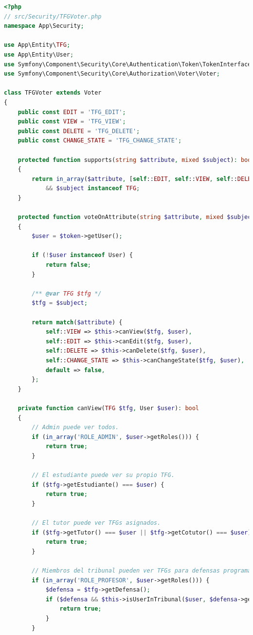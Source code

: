 \documentclass[12pt,a4paper,oneside]{report}
\begin{document}
\begin{lstlisting}[language=PHP]
<?php
// src/Security/TFGVoter.php
namespace App\Security;

use App\Entity\TFG;
use App\Entity\User;
use Symfony\Component\Security\Core\Authentication\Token\TokenInterface;
use Symfony\Component\Security\Core\Authorization\Voter\Voter;

class TFGVoter extends Voter
{
    public const EDIT = 'TFG_EDIT';
    public const VIEW = 'TFG_VIEW';
    public const DELETE = 'TFG_DELETE';
    public const CHANGE_STATE = 'TFG_CHANGE_STATE';

    protected function supports(string $attribute, mixed $subject): bool
    {
        return in_array($attribute, [self::EDIT, self::VIEW, self::DELETE, self::CHANGE_STATE])
            && $subject instanceof TFG;
    }

    protected function voteOnAttribute(string $attribute, mixed $subject, TokenInterface $token): bool
    {
        $user = $token->getUser();

        if (!$user instanceof User) {
            return false;
        }

        /** @var TFG $tfg */
        $tfg = $subject;

        return match($attribute) {
            self::VIEW => $this->canView($tfg, $user),
            self::EDIT => $this->canEdit($tfg, $user),
            self::DELETE => $this->canDelete($tfg, $user),
            self::CHANGE_STATE => $this->canChangeState($tfg, $user),
            default => false,
        };
    }

    private function canView(TFG $tfg, User $user): bool
    {
        // Admin puede ver todos.
        if (in_array('ROLE_ADMIN', $user->getRoles())) {
            return true;
        }

        // El estudiante puede ver su propio TFG.
        if ($tfg->getEstudiante() === $user) {
            return true;
        }

        // El tutor puede ver TFGs asignados.
        if ($tfg->getTutor() === $user || $tfg->getCotutor() === $user) {
            return true;
        }

        // Miembros del tribunal pueden ver TFGs para defensas programadas.
        if (in_array('ROLE_PROFESOR', $user->getRoles())) {
            $defensa = $tfg->getDefensa();
            if ($defensa && $this->isUserInTribunal($user, $defensa->getTribunal())) {
                return true;
            }
        }


\end{lstlisting}
\end{document}

